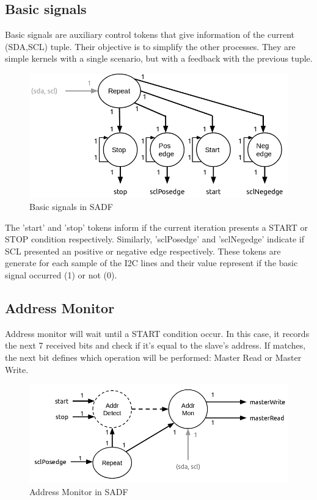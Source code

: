 \documentclass{article}
\begin{document}
\subsection{Basic signals}
Basic signals are auxiliary control tokens that give information of the current (SDA,SCL) tuple. Their objective is to simplify the other processes. They are simple kernels with a single scenario, but with a feedback with the previous tuple.
\begin{figure}
  \includegraphics[width=\linewidth]{img/block_basic.png}
  \caption{Basic signals in SADF}
  \label{fig:block_basic}
\end{figure}

The 'start' and 'stop' tokens inform if the current iteration presents a START or STOP condition respectively. Similarly, 'sclPosedge' and 'sclNegedge' indicate if SCL presented an positive or negative edge respectively. These tokens are generate for each sample of the I2C lines and their value represent if the basic signal occurred (1) or not (0).

\subsection{Address Monitor}
Address monitor will wait until a START condition occur. In this case, it records the next 7 received bits and check if it's equal to the slave's address. If matches, the next bit defines which operation will be performed: Master Read or Master Write.
\begin{figure}
  \includegraphics[width=\linewidth]{img/block_address.png}
  \caption{Address Monitor in SADF}
  \label{fig:block_address}
\end{figure}
\end{document}

